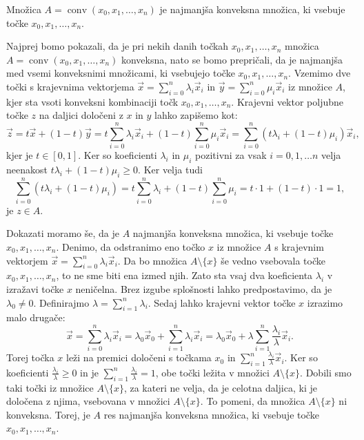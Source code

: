 \documentclass[mat1]{fmfdelo}
\DeclareMathOperator{\conv}{conv}
\newcommand{\0}{\underline{0}}
\begin{document}
\begin{trditev}
Množica $A = \conv(x_0, x_1, \dots, x_n)$ je najmanjša konveksna množica, ki vsebuje točke $x_0, x_1, \dots, x_n$.
\end{trditev}
\begin{dokaz}
Najprej bomo pokazali, da je pri nekih danih točkah $x_0, x_1, \dots, x_n$ množica $A = \conv(x_0, x_1, \dots, x_n)$ konveksna, nato se bomo prepričali, da je najmanjša med vsemi konveksnimi množicami, ki vsebujejo točke $x_0, x_1, \dots, x_n$. Vzemimo dve točki s krajevnima vektorjema $\vec{x} = \sum\limits_{i=0}^n \lambda_i \vec{x}_i$ in $\vec{y} = \sum\limits_{i=0}^n \mu_i \vec{x}_i$ iz množice $A$, kjer sta vsoti konveksni kombinaciji točk $x_0, x_1, \dots, x_n$.
Krajevni vektor poljubne točke $z$ na daljici določeni z $x$ in $y$ lahko zapišemo kot:
$$\vec{z} = t \vec{x} + (1-t) \vec{y} = t \sum\limits_{i=0}^n \lambda_i \vec{x}_i + (1 - t) \sum\limits_{i=0}^n \mu_i \vec{x}_i = \sum\limits_{i=0}^n (t \lambda_i + (1 - t) \mu_i) \vec{x}_i,$$
kjer je $t \in [0, 1]$. Ker so koeficienti $\lambda_i$ in $\mu_i$ pozitivni za vsak $i = 0, 1, \dots n$ velja neenakost $t \lambda_i + (1 - t) \mu_i \geq 0$. Ker velja tudi
$$\sum\limits_{i=0}^n (t \lambda_i + (1 - t) \mu_i) = t \sum\limits_{i=0}^n \lambda_i + (1 - t) \sum\limits_{i=0}^n \mu_i = t \cdot 1 + (1 - t) \cdot 1 = 1,$$
je $z \in A$.

Dokazati moramo še, da je $A$ najmanjša konveksna množica, ki vsebuje točke $x_0, x_1, \dots, x_n$. Denimo, da odstranimo eno točko $x$ iz množice $A$ s krajevnim vektorjem $\vec{x} = \sum\limits_{i=0}^n \lambda_i \vec{x}_i$. Da bo množica $A \setminus \{ x \}$ še vedno vsebovala točke $x_0, x_1, \dots, x_n$, to ne sme biti ena izmed njih. Zato sta vsaj dva koeficienta $\lambda_i$ v izražavi točke $x$ neničelna. Brez izgube splošnosti lahko predpostavimo, da je $\lambda_0 \neq 0$. Definirajmo $\lambda =  \sum\limits_{i=1}^n \lambda_i$. Sedaj lahko krajevni vektor točke $x$ izrazimo malo drugače:
$$\vec{x} = \sum\limits_{i=0}^n \lambda_i \vec{x}_i = \lambda_0 \vec{x}_0 + \sum\limits_{i=1}^n \lambda_i \vec{x}_i = \lambda_0 \vec{x}_0 + \lambda \sum\limits_{i=1}^n \frac{\lambda_i}{\lambda} \vec{x}_i.$$
Torej točka $x$ leži na premici določeni s točkama $x_0$ in $\sum\limits_{i=1}^n \frac{\lambda_i}{\lambda} \vec{x}_i$. Ker so koeficienti $\frac{\lambda_i}{\lambda} \geq 0$ in je $\sum\limits_{i=1}^n \frac{\lambda_i}{\lambda} = 1$, obe točki ležita v množici $A \setminus \{ x \}$. Dobili smo taki točki iz množice $A \setminus \{ x \}$, za kateri ne velja, da je celotna daljica, ki je določena z njima, vsebovana v množici $A \setminus \{ x \}$. To pomeni, da množica $A \setminus \{ x \}$ ni konveksna. Torej, je $A$ res najmanjša konveksna množica, ki vsebuje točke $x_0, x_1, \dots, x_n$.
\end{dokaz}
\end{document}
